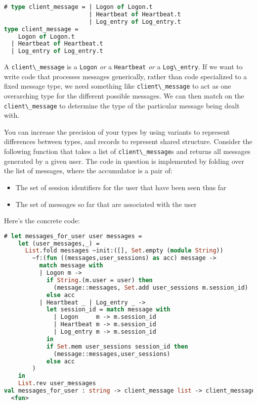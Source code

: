 \begin{lstlisting}[language=Caml]
# type client_message = | Logon of Logon.t
                        | Heartbeat of Heartbeat.t
                        | Log_entry of Log_entry.t
type client_message =
    Logon of Logon.t
  | Heartbeat of Heartbeat.t
  | Log_entry of Log_entry.t
\end{lstlisting}

A \passthrough{\lstinline!client\_message!} is a
\passthrough{\lstinline!Logon!} \emph{or} a
\passthrough{\lstinline!Heartbeat!} \emph{or} a
\passthrough{\lstinline!Log\_entry!}. If we want to write code that
processes messages generically, rather than code specialized to a fixed
message type, we need something like
\passthrough{\lstinline!client\_message!} to act as one overarching type
for the different possible messages. We can then match on the
\passthrough{\lstinline!client\_message!} to determine the type of the
particular message being dealt with.

You can increase the precision of your types by using variants to
represent differences between types, and records to represent shared
structure. Consider the following function that takes a list of
\passthrough{\lstinline!client\_message!}s and returns all messages
generated by a given user. The code in question is implemented by
folding over the list of messages, where the accumulator is a pair of:

\begin{itemize}
\item
  The set of session identifiers for the user that have been seen thus
  far
\item
  The set of messages so far that are associated with the user
\end{itemize}

Here's the concrete code:

\begin{lstlisting}[language=Caml]
# let messages_for_user user messages =
    let (user_messages,_) =
      List.fold messages ~init:([], Set.empty (module String))
        ~f:(fun ((messages,user_sessions) as acc) message ->
          match message with
          | Logon m ->
            if String.(m.user = user) then
              (message::messages, Set.add user_sessions m.session_id)
            else acc
          | Heartbeat _ | Log_entry _ ->
            let session_id = match message with
              | Logon     m -> m.session_id
              | Heartbeat m -> m.session_id
              | Log_entry m -> m.session_id
            in
            if Set.mem user_sessions session_id then
              (message::messages,user_sessions)
            else acc
        )
    in
    List.rev user_messages
val messages_for_user : string -> client_message list -> client_message list =
  <fun>
\end{lstlisting}

